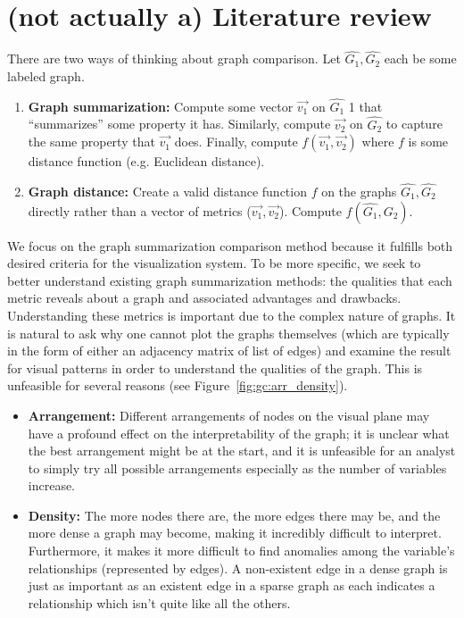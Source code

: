 \section{(not actually a) Literature review}
\label{sec:gc:litreview}

There are two ways of thinking about graph comparison. Let $\hat{G_1}, 
\hat{G_2}$ each be some labeled graph. 

\tablespacing
\begin{enumerate}
	\item \textbf{Graph summarization:} Compute some vector 
	$\overrightarrow{v_1}$ on $\hat{G_1}$ 1 that ``summarizes'' some property 
	it has. Similarly, compute $\overrightarrow{v_2}$ on $\hat{G_2}$ to capture 
	the same property that $\overrightarrow{v_1}$ does. Finally, compute 
	$f(\overrightarrow{v_1},\overrightarrow{v_2})$ where $f$ is some distance 
	function (e.g. Euclidean distance).
	\item \textbf{Graph distance:} Create a valid distance function $f$ on the 
	graphs $\hat{G_1}, \hat{G_2}$ directly rather than a vector of metrics 
	($\overrightarrow{v_1},\overrightarrow{v_2}$). 
	Compute $f(\hat{G_1},\hat{G_2})$.
\end{enumerate}
\bodyspacing

We focus on the graph summarization comparison method because it fulfills both 
desired criteria for the visualization system. To be more specific, we seek to 
better understand existing graph summarization methods: the qualities that each 
metric reveals about a graph and associated advantages and drawbacks. 
Understanding these metrics is important due to the complex nature of graphs.
It is natural to ask why one cannot plot the graphs themselves (which are 
typically in the form of either an adjacency matrix of list of edges) and 
examine the result for visual patterns in order to understand the qualities 
of the graph. This is unfeasible for several reasons (see 
Figure~\ref{fig:gc:arr_density}). 

\tablespacing
\begin{itemize}
	\item \textbf{Arrangement:} Different arrangements of nodes on the visual 
	plane may have a profound effect on the interpretability of the graph; it 
	is unclear what the best arrangement might be at the start, and it is 
	unfeasible for an analyst to simply try all possible arrangements 
	especially as the number of variables increase.
	\item \textbf{Density:} The more nodes there are, the more edges there may 
	be, and the more dense a graph may become, making it incredibly difficult 
	to interpret. Furthermore, it makes it more difficult to find anomalies 
	among the variable's relationships (represented by edges). A non-existent 
	edge in a dense graph is just as important as an existent edge in a sparse 
	graph as each indicates a relationship which isn't quite like all the 
	others.
\end{itemize}
\bodyspacing

